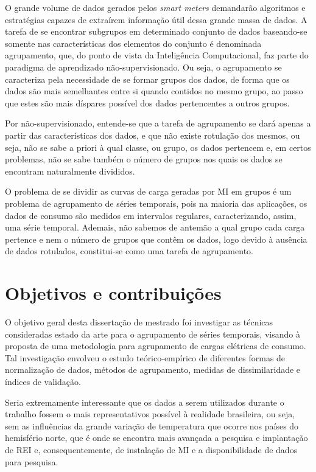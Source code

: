 O grande volume de dados gerados pelos \emph{smart meters} demandarão algoritmos e estratégias capazes de extraírem informação útil dessa grande massa de dados. A tarefa de se encontrar subgrupos em determinado conjunto de dados baseando-se somente nas características dos elementos do conjunto é denominada agrupamento, que, do ponto de vista da Inteligência Computacional, faz parte do paradigma de aprendizado não-supervisionado. Ou seja, o agrupamento se caracteriza pela necessidade de se formar grupos dos dados, de forma que os dados são mais semelhantes entre si quando contidos no mesmo grupo, ao passo que estes são mais díspares possível dos dados pertencentes a outros grupos. 

Por não-supervisionado, entende-se que a tarefa de agrupamento se dará apenas a partir das características dos dados, e que não existe rotulação dos mesmos, ou seja, não se sabe a priori à qual classe, ou grupo, os dados pertencem e, em certos problemas, não se sabe também o número de grupos nos quais os dados se encontram naturalmente divididos.

O problema de se dividir as curvas de carga geradas por MI em grupos é um problema de agrupamento de séries temporais, pois na maioria das aplicações, os dados de consumo são medidos em intervalos regulares, caracterizando, assim, uma série temporal. Ademais, não sabemos de antemão a qual grupo cada carga pertence e nem o número de grupos que contêm os dados, logo devido à ausência de dados rotulados, constitui-se como uma tarefa de agrupamento.

\section{Objetivos e contribuições}

O objetivo geral desta dissertação de mestrado foi investigar as técnicas consideradas estado da arte para o agrupamento de séries temporais, visando à proposta de uma metodologia para agrupamento de cargas elétricas de consumo. Tal investigação envolveu o estudo teórico-empírico de diferentes formas de normalização de dados, métodos de agrupamento, medidas de dissimilaridade e índices de validação.

Seria extremamente interessante que os dados a serem utilizados durante o trabalho fossem o mais representativos possível à realidade brasileira, ou seja, sem as influências da grande variação de temperatura que ocorre nos países do hemisfério norte, que é onde se encontra mais avançada a pesquisa e implantação de REI e, consequentemente, de instalação de MI e a disponibilidade de dados para pesquisa.

